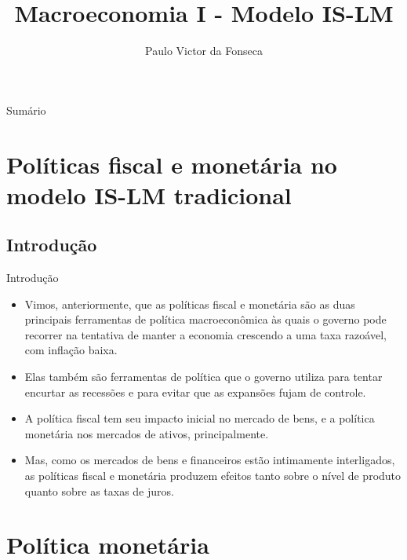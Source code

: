 \documentclass[10pt]{beamer}
\title[]{Macroeconomia I - Modelo IS-LM}
\author[]{Paulo Victor da Fonseca}
\date{}
\begin{document}
\begin{frame}[plain]
\end{frame}

\begin{frame}{Sumário}
    \tableofcontents
\end{frame}

\section{Políticas fiscal e monetária no modelo IS-LM tradicional}
\subsection{Introdução}
\begin{frame}{Introdução}
    \begin{itemize}
        \item Vimos, anteriormente, que as políticas fiscal e monetária são as duas principais ferramentas de política macroeconômica às quais o governo pode recorrer na tentativa de manter a economia crescendo a uma taxa razoável, com inflação baixa.
        \bigskip
        \item Elas também são ferramentas de política que o governo utiliza para tentar encurtar as recessões e para evitar que as expansões fujam de controle.
        \bigskip
        \item A política fiscal tem seu impacto inicial no mercado de bens, e a política monetária nos mercados de ativos, principalmente.
        \bigskip
        \item Mas, como os mercados de bens e financeiros estão intimamente interligados, as políticas fiscal e monetária produzem efeitos tanto sobre o nível de produto quanto sobre as taxas de juros.
    \end{itemize}
\end{frame}

\section{Política monetária}
\end{document}
